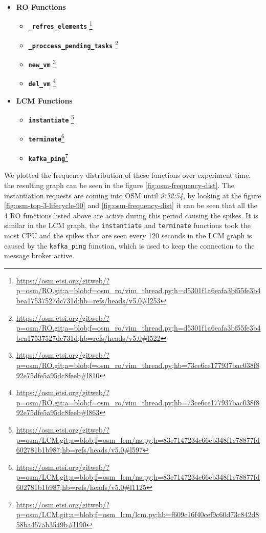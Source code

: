 \begin{itemize}
\item \textbf{RO Functions}
\begin{itemize}
\item \texttt{\textbf{\_refres\_elements}} \footnote{\url{https://osm.etsi.org/gitweb/?p=osm/RO.git;a=blob;f=osm\_ro/vim\_thread.py;h=d5301f1a6eafa3bf55fe3b4bea17537527dc731d;hb=refs/heads/v5.0\#l253}}

\item \texttt{\textbf{\_proccess\_pending\_tasks}} \footnote{\url{https://osm.etsi.org/gitweb/?p=osm/RO.git;a=blob;f=osm\_ro/vim\_thread.py;h=d5301f1a6eafa3bf55fe3b4bea17537527dc731d;hb=refs/heads/v5.0\#l522}}

\item \texttt{\textbf{new\_vm}} \footnote{\url{https://osm.etsi.org/gitweb/?p=osm/RO.git;a=blob;f=osm\_ro/vim\_thread.py;hb=73ce6ce177937bac038f892e75dfe5a95dc8feeb\#l810}}

\item \texttt{\textbf{del\_vm}} \footnote{\url{https://osm.etsi.org/gitweb/?p=osm/RO.git;a=blob;f=osm\_ro/vim\_thread.py;hb=73ce6ce177937bac038f892e75dfe5a95dc8feeb\#l863}}
\end{itemize}

\item \textbf{LCM Functions}

\begin{itemize}

\item \texttt{\textbf{instantiate}} \footnote{\url{https://osm.etsi.org/gitweb/?p=osm/LCM.git;a=blob;f=osm\_lcm/ns.py;h=83e7147234c66cb348f1c78877fd602781b1b987;hb=refs/heads/v5.0\#l597}}

\item \texttt{\textbf{terminate}}\footnote{\url{https://osm.etsi.org/gitweb/?p=osm/LCM.git;a=blob;f=osm\_lcm/ns.py;h=83e7147234c66cb348f1c78877fd602781b1b987;hb=refs/heads/v5.0\#l1125}}

\item \texttt{\textbf{kafka\_ping}}\footnote{\url{https://osm.etsi.org/gitweb/?p=osm/LCM.git;a=blob;f=osm\_lcm/lcm.py;hb=f609c16f40cef9c60d73c842d858ba457ab3549b\#l190}}
\end{itemize}

\end{itemize}

We plotted the frequency distribution of these functions over experiment time, the resulting graph can be seen in the figure \ref{fig:osm-frequency-dist}. The instantiation requests are coming into OSM until \textit{9:32:54}, by looking at the figure \ref{fig:osm-top-3-lifecycle-90} and \ref{fig:osm-frequency-dist} it can be seen that all the 4 RO functions listed above are active during this period causing the spikes. It is similar in the LCM graph, the \texttt{instantiate} and \texttt{terminate}  functions took the most CPU and the spikes that are seen every 120 seconds in the LCM graph is caused by the \texttt{kafka\_ping} function, which is used to keep the connection to the message broker active. 


